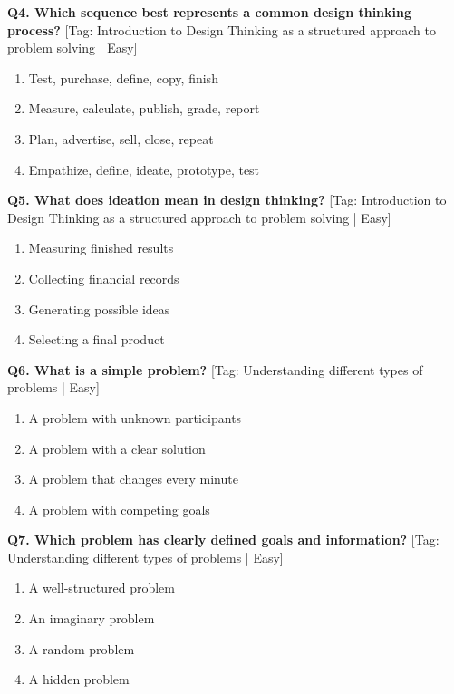 \noindent\textbf{Q4. Which sequence best represents a common design thinking process?} \hfill [Tag: Introduction to Design Thinking as a structured approach to problem solving | Easy]
\begin{enumerate}[label=(\alph*),topsep=2pt,itemsep=1pt,partopsep=0pt,parsep=0pt]
    \item {Test, purchase, define, copy, finish}
    \item {Measure, calculate, publish, grade, report}
    \item {Plan, advertise, sell, close, repeat}
    \item {Empathize, define, ideate, prototype, test}
\end{enumerate}
\vspace{2mm}

\noindent\textbf{Q5. What does ideation mean in design thinking?} \hfill [Tag: Introduction to Design Thinking as a structured approach to problem solving | Easy]
\begin{enumerate}[label=(\alph*),topsep=2pt,itemsep=1pt,partopsep=0pt,parsep=0pt]
    \item {Measuring finished results}
    \item {Collecting financial records}
    \item {Generating possible ideas}
    \item {Selecting a final product}
\end{enumerate}
\vspace{2mm}

\noindent\textbf{Q6. What is a simple problem?} \hfill [Tag: Understanding different types of problems | Easy]
\begin{enumerate}[label=(\alph*),topsep=2pt,itemsep=1pt,partopsep=0pt,parsep=0pt]
    \item {A problem with unknown participants}
    \item {A problem with a clear solution}
    \item {A problem that changes every minute}
    \item {A problem with competing goals}
\end{enumerate}
\vspace{2mm}

\noindent\textbf{Q7. Which problem has clearly defined goals and information?} \hfill [Tag: Understanding different types of problems | Easy]
\begin{enumerate}[label=(\alph*),topsep=2pt,itemsep=1pt,partopsep=0pt,parsep=0pt]
    \item {A well-structured problem}
    \item {An imaginary problem}
    \item {A random problem}
    \item {A hidden problem}
\end{enumerate}
\vspace{2mm}

